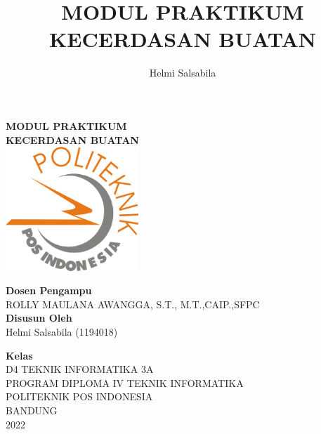 \documentclass[a4paper,12pt]{templates}
\title{MODUL PRAKTIKUM KECERDASAN BUATAN}
\author{Helmi Salsabila}
\begin{document}
	\begin{center}
			\textbf{MODUL PRAKTIKUM}\\
		\vspace{0.3cm}
			\textbf {KECERDASAN BUATAN}\\
		\vspace{1cm}
			\includegraphics [width=5cm] {images/logo-polpos.png}
		
		\vspace{1cm}
			\textbf{Dosen Pengampu}\\
				ROLLY MAULANA AWANGGA, S.T., M.T.,CAIP.,SFPC\\

		\vspace{1cm}
			\textbf{Disusun Oleh}\\
				Helmi Salsabila (1194018)\\
				
			\vspace{0.5cm}
			
			\textbf{Kelas}\\
				D4 TEKNIK INFORMATIKA 3A 
		\vspace{3cm}
		\\PROGRAM DIPLOMA IV TEKNIK INFORMATIKA\\POLITEKNIK POS INDONESIA\\BANDUNG\\2022 

\newpage

\begin{romanpages}          %
\tableofcontents            %
\listoffigures              %
\end{romanpages} 

\end{center}



	
\end{document}
